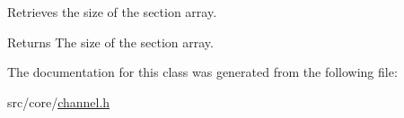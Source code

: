 Retrieves the size of the section array. 

\begin{DoxyReturn}{Returns}
The size of the section array. 
\end{DoxyReturn}


The documentation for this class was generated from the following file:\begin{DoxyCompactItemize}
\item 
src/core/\hyperlink{channel_8h}{channel.h}\end{DoxyCompactItemize}
